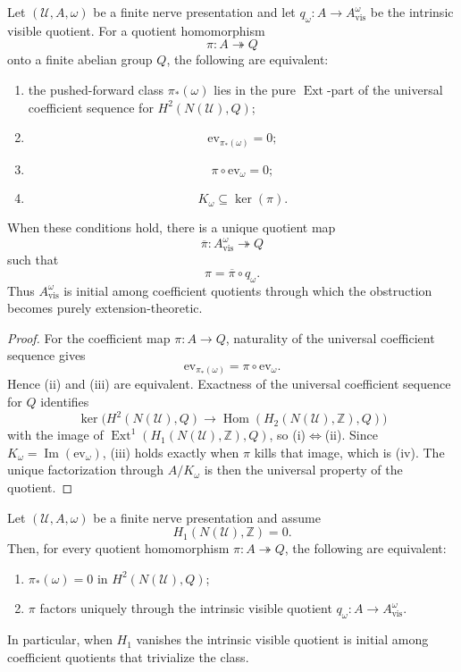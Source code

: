 \begin{theorem}\label{thm:intrinsic-pure-ext-initiality}
Let $(\mathcal U,A,\omega)$ be a finite nerve presentation and let
$q_{\omega}:A\to A_{\mathrm{vis}}^{\omega}$ be the intrinsic visible quotient.
For a quotient homomorphism
\[
\pi:A\twoheadrightarrow Q
\]
onto a finite abelian group $Q$, the following are equivalent:
\begin{enumerate}[label=(\roman*),nosep]
\item the pushed-forward class $\pi_*(\omega)$ lies in the pure
$\operatorname{Ext}$-part of the universal coefficient sequence for
$H^2(N(\mathcal U),Q)$;
\item
\[
\mathrm{ev}_{\pi_*(\omega)}=0;
\]
\item
\[
\pi\circ \mathrm{ev}_{\omega}=0;
\]
\item
\[
K_{\omega}\subseteq \ker(\pi).
\]
\end{enumerate}
When these conditions hold, there is a unique quotient map
\[
\overline\pi:A_{\mathrm{vis}}^{\omega}\twoheadrightarrow Q
\]
such that
\[
\pi=\overline\pi\circ q_{\omega}.
\]
Thus $A_{\mathrm{vis}}^{\omega}$ is initial among coefficient quotients through
which the obstruction becomes purely extension-theoretic.
\end{theorem}

\begin{proof}
For the coefficient map $\pi:A\to Q$, naturality of the universal coefficient
sequence gives
\[
\mathrm{ev}_{\pi_*(\omega)}=\pi\circ \mathrm{ev}_{\omega}.
\]
Hence \textup{(ii)} and \textup{(iii)} are equivalent. Exactness of the
universal coefficient sequence for $Q$ identifies
\[
\ker\!\bigl(H^2(N(\mathcal U),Q)\to
\operatorname{Hom}(H_2(N(\mathcal U),\mathbb Z),Q)\bigr)
\]
with the image of
$\operatorname{Ext}^1(H_1(N(\mathcal U),\mathbb Z),Q)$, so
\textup{(i)}$\Leftrightarrow$\textup{(ii)}. Since
$K_{\omega}=\operatorname{Im}(\mathrm{ev}_{\omega})$,
\textup{(iii)} holds exactly when $\pi$ kills that image, which is
\textup{(iv)}. The unique factorization through $A/K_{\omega}$ is then the
universal property of the quotient.
\end{proof}

\begin{corollary}\label{cor:h1-vanishing-class-trivializing}
Let $(\mathcal U,A,\omega)$ be a finite nerve presentation and assume
\[
H_1(N(\mathcal U),\mathbb Z)=0.
\]
Then, for every quotient homomorphism $\pi:A\twoheadrightarrow Q$, the
following are equivalent:
\begin{enumerate}[label=(\roman*),nosep]
\item $\pi_*(\omega)=0$ in $H^2(N(\mathcal U),Q)$;
\item $\pi$ factors uniquely through the intrinsic visible quotient
$q_{\omega}:A\to A_{\mathrm{vis}}^{\omega}$.
\end{enumerate}
In particular, when $H_1$ vanishes the intrinsic visible quotient is initial
among coefficient quotients that trivialize the class.
\end{corollary}

